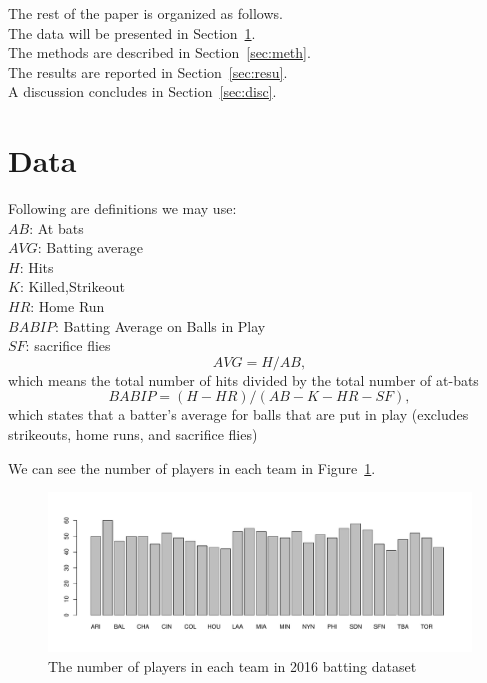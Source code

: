 \documentclass[12pt]{article}
\begin{document}
The rest of the paper is organized as follows.\\
The data will be presented in Section~\ref{sec:data}.\\
The methods are described in Section~\ref{sec:meth}.\\
The results are reported in Section~\ref{sec:resu}.\\
A discussion concludes in Section~\ref{sec:disc}.\\


\section{Data}
\label{sec:data}
Following are definitions we may use:\\
$AB$: At bats\\ 
$AVG$: Batting average\\ 
$H$: Hits\\
$K$: Killed,Strikeout \\
$HR$: Home Run\\
$BABIP$: Batting Average on Balls in Play\\
$SF$: sacrifice flies\\
\begin{equation}
  \label{eq:AVG}
  AVG = H/AB,
\end{equation}
which means the total number of hits divided by the total number of at-bats
\begin{equation}
  \label{eq:BABIP}
  BABIP = (H - HR) / (AB - K - HR - SF),
\end{equation}
which states that a batter's average for balls that are put in play (excludes strikeouts, home runs, and sacrifice flies)


We can see the number of players in each team in Figure~\ref{fig:team}.
\graphicspath{{images/}}

\begin{figure}[tbp]
  \centering
  \includegraphics[width=\textwidth]{baseball team.pdf}
  \caption{The number of players in each team in 2016 batting dataset}
  \label{fig:team}
\end{figure}
\end{document}
